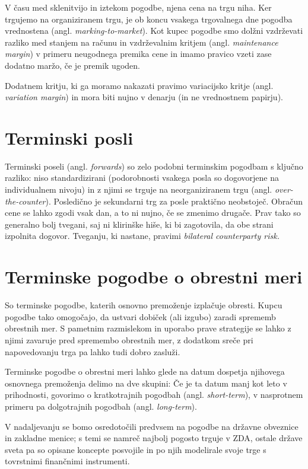 \documentclass[a4paper, 12pt]{article}
\begin{document}
V času med sklenitvijo in iztekom pogodbe, njena cena na trgu niha. Ker trgujemo na organiziranem
trgu, je ob koncu vsakega trgovalnega dne pogodba vrednostena (angl. \textit{marking-to-market}). 
Kot kupec pogodbe smo dolžni vzdrževati razliko med stanjem na računu in vzdrževalnim kritjem
(angl. \textit{maintenance margin}) v primeru neugodnega premika cene in imamo pravico vzeti zase 
dodatno maržo, če je premik ugoden. 

Dodatnem kritju, ki ga moramo nakazati pravimo variacijsko kritje (angl. \textit{variation margin}) 
in mora biti nujno v denarju (in ne vrednostnem papirju).

\section{Terminski posli}
Terminski poseli (angl. \textit{forwards}) so zelo podobni terminskim pogodbam s ključno razliko:
niso standardizirani (podorobnosti vsakega posla so dogovorjene na individualnem nivoju) in z njimi
se trguje na neorganiziranem trgu (angl. \textit{over-the-counter}). Posledično je sekundarni trg za 
posle praktično neobstoječ. Obračun cene se lahko zgodi vsak dan, a to ni nujno, če se zmenimo drugače.
Prav tako so generalno bolj tvegani, saj ni klirinške hiše, ki bi zagotovila, da obe strani izpolnita
dogovor. Tveganju, ki nastane, pravimi \textit{bilateral counterparty risk.}

\section{Terminske pogodbe o obrestni meri}
So terminske pogodbe, katerih osnovno premoženje izplačuje obresti. Kupcu pogodbe tako omogočajo, da 
ustvari dobiček (ali izgubo) zaradi sprememb obrestnih mer. S pametnim razmislekom in uporabo prave 
strategije se lahko z njimi zavaruje pred spremembo obrestnih mer, z dodatkom sreče pri napovedovanju
trga pa lahko tudi dobro zasluži.


Terminske pogodbe o obrestni meri lahko glede na datum dospetja njihovega osnovnega premoženja delimo na 
dve skupini: Če je ta datum manj kot leto v prihodnosti, govorimo o kratkotrajnih pogodbah (angl. 
\textit{short-term}),  v nasprotnem primeru pa dolgotrajnih pogodbah (angl. \textit{long-term}). 

V nadaljevanju se bomo osredotočili predvsem na pogodbe na državne obveznice in zakladne menice; s temi
se namreč najbolj pogosto trguje v ZDA, ostale države sveta pa so opisane koncepte posvojile in po njih
modelirale svoje trge s tovrstnimi finančnimi instrumenti.
\end{document}
